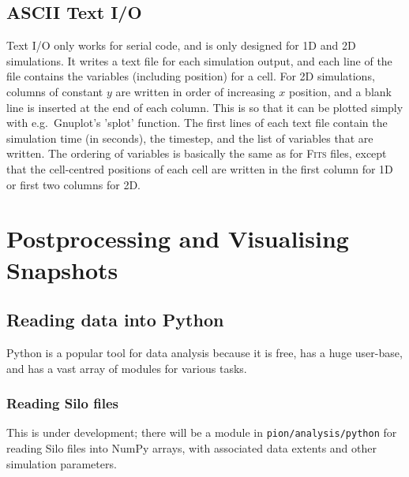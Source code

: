 \documentclass[a4paper,11pt]{report}
\begin{document}
\section{ASCII Text I/O}
Text I/O only works for serial code, and is only designed for 1D and 2D simulations.
It writes a text file for each simulation output, and each line of the file contains the variables (including position) for a cell.
For 2D simulations, columns of constant $y$ are written in order of increasing $x$ position, and a blank line is inserted at the end of each column.
This is so that it can be plotted simply with e.g.\ Gnuplot's 'splot' function.
The first lines of each text file contain the simulation time (in seconds), the timestep, and the list of variables that are written.
The ordering of variables is basically the same as for \textsc{Fits} files, except that the cell-centred positions of each cell are written in the first column for 1D or first two columns for 2D.

\chapter{Postprocessing and Visualising \pion{} Snapshots}

\section{Reading data into Python}
Python is a popular tool for data analysis because it is free, has a huge user-base, and has a vast array of modules for various tasks.

\subsection{Reading Silo files}
This is under development; there will be a module in \lstinline{pion/analysis/python} for reading Silo files into NumPy arrays, with associated data extents and other simulation parameters.
\end{document}
